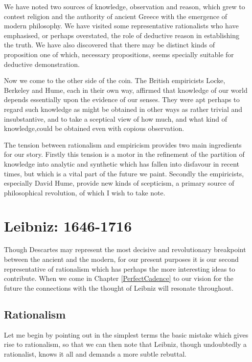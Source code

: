We have noted two sources of knowledge, observation and reason, which grew to contest religion and the authority of ancient Greece with the emergence of modern philosophy.
We have visited some representative rationalists who have emphasised, or perhaps overstated, the role of deductive reason in establishing the truth.
We have also discovered that there may be distinct kinds of proposition one of which, necessary propositions, seems specially suitable for deductive demonstration.

Now we come to the other side of the coin.
The British empiricists Locke, Berkeley and Hume, each in their own way, affirmed that knowledge of our world depends essentially upon the evidence of our senses.
They were apt perhaps to regard such knowledge as might be obtained in other ways as rather trivial and insubstantive, and to take a sceptical view of how much, and what kind of knowledge,could be obtained even with copious observation.

The tension between rationalism and empiricism provides two main ingredients for our story.
Firstly this tension is a motor in the refinement of the partition of knowledge into analytic and synthetic which has fallen into disfavour in recent times, but which is a vital part of the future we paint.
Secondly the empiricists, especially David Hume, provide new kinds of scepticism, a primary source of philosophical revolution, of which I wish to take note.


\section{Leibniz: 1646-1716}\label{Leibniz}

Though Descartes may represent the most decisive and revolutionary breakpoint between the ancient and the modern, for our present purposes it is our second representative of rationalism which has perhaps the more interesting ideas to contribute.
When we come in Chapter \ref{PerfectCadence} to our vision for the future the connections with the thought of Leibniz will resonate throughout.

\subsection{Rationalism}

Let me begin by pointing out in the simplest terms the basic mistake which gives rise to rationalism, so that we can then note that Leibniz, though undoubtedly a rationalist, knows it all and demands a more subtle rebuttal.

